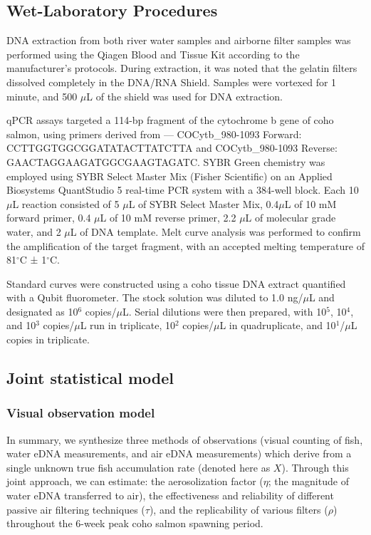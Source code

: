 \documentclass{article}
\begin{document}
\subsection{Wet-Laboratory Procedures}
DNA extraction from both river water samples and airborne filter samples was performed using the Qiagen Blood and Tissue Kit according to the manufacturer’s protocols. During extraction, it was noted that the gelatin filters dissolved completely in the DNA/RNA Shield. Samples were vortexed for 1 minute, and 500 $\mu$L of the shield was used for DNA extraction.

qPCR assays targeted a 114-bp fragment of the cytochrome b gene of coho salmon, using primers derived from \cite{duda2021}— COCytb\_980-1093 Forward: CCTTGGTGGCGGATATACTTATCTTA and COCytb\_980-1093 Reverse: GAACTAGGAAGATGGCGAAGTAGATC. SYBR Green chemistry was employed using SYBR Select Master Mix (Fisher Scientific) on an Applied Biosystems QuantStudio 5 real-time PCR system with a 384-well block. Each 10 $\mu$L reaction consisted of 5 $\mu$L of SYBR Select Master Mix, 0.4$\mu$L of 10 mM forward primer, 0.4 $\mu$L of 10 mM reverse primer, 2.2 $\mu$L of molecular grade water, and 2 $\mu$L of DNA template. Melt curve analysis was performed to confirm the amplification of the target fragment, with an accepted melting temperature of 81$^\circ$C ± 1$^\circ$C.

Standard curves were constructed using a coho tissue DNA extract quantified with a Qubit fluorometer. The stock solution was diluted to 1.0 ng/$\mu$L and designated as 10$^6$ copies/$\mu$L. Serial dilutions were then prepared, with 10$^5$, 10$^4$, and 10$^3$ copies/$\mu$L run in triplicate, 10$^2$ copies/$\mu$L in quadruplicate, and 10$^1$/$\mu$L copies in triplicate.


\subsection{Joint statistical model}
\subsubsection{Visual observation model}
In summary, we synthesize three methods of observations (visual counting of fish, water eDNA measurements, and air eDNA measurements) which derive from a single unknown true fish accumulation rate (denoted here as $X$). Through this joint approach, we can estimate: the aerosolization factor ($\eta$; the magnitude of water eDNA transferred to air), the effectiveness and reliability of different passive air filtering techniques ($\tau$), and the replicability of various filters ($\rho$) throughout the 6-week peak coho salmon spawning period.
\end{document}
